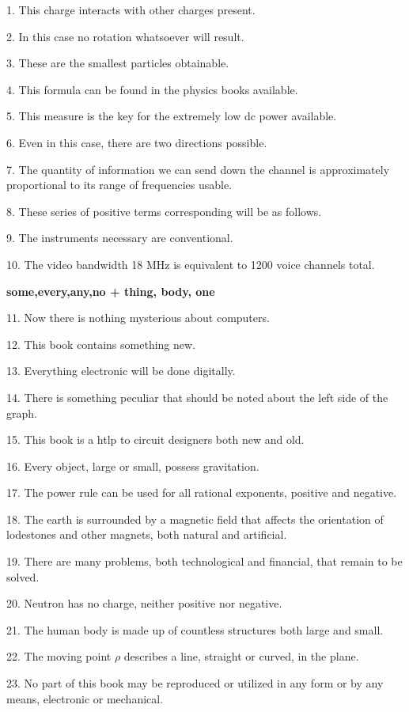 \documentclass[a4paper,twocolumn,10pt]{article}
\begin{document}
\begin{CJK}{UTF8}{gkai}
	1. This charge interacts with other charges present.

	2. In this case no rotation whatsoever will result.

	3. These are the smallest particles obtainable.

	4. This formula can be found in the physics books available.

	5. This measure is the key for the extremely low dc power available.

	6. Even in this case, there are two directions possible.

	7. The quantity of information we can send down the channel is approximately
	proportional to its range of frequencies usable.

	8. These series of positive terms corresponding will be as follows.

	9. The instruments necessary are conventional.

	10. The video bandwidth 18 MHz is equivalent to 1200 voice channels total.

	{\bf some,every,any,no + thing, body, one}

	11. Now there is nothing mysterious about computers.

	12. This book contains something new.

	13. Everything electronic will be done digitally.

	14. There is something peculiar that should be noted about the left side
	of the graph.

	15. This book is a htlp to circuit designers both new and old.

	16. Every object, large or small, possess gravitation.

	17. The power rule can be used for all rational exponents, positive and negative.

	18. The earth is surrounded by a magnetic field that affects the orientation of lodestones
	and other magnets, both natural and artificial.

	19. There are many problems, both technological and financial, that remain to be solved.

	20. Neutron has no charge, neither positive nor negative.

	21. The human body is made up of countless structures both large and small.

	22. The moving point $\rho$ describes a line, straight or curved, in the plane.

	23. No part of this book may be reproduced or utilized in any form or by any
	means, electronic or mechanical.


\end{CJK}
\end{document}
